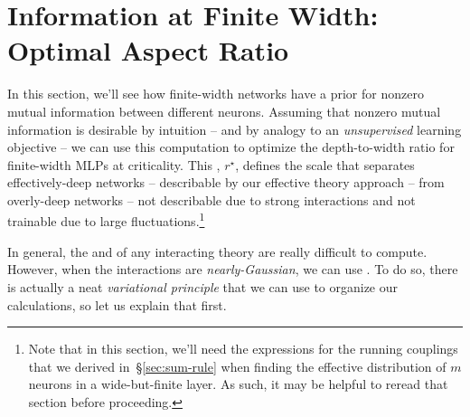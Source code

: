 \section{Information at Finite Width: Optimal Aspect Ratio}\label{sec:information-beyond-infinity}
In this section, we'll see how finite-width networks have a prior for nonzero mutual information between different neurons.
Assuming that nonzero mutual information is desirable by intuition -- and by analogy to an \emph{unsupervised} learning objective -- we can use this computation to optimize the depth-to-width ratio for finite-width MLPs at criticality. This , $r^\star$, defines the scale that separates effectively-deep networks -- describable by our  effective theory approach -- from overly-deep networks -- not describable due to strong interactions and not trainable due to large fluctuations.\footnote{Note that in this section, we'll need the expressions for the running couplings that we derived in~\S\ref{sec:sum-rule} when finding the effective distribution of $m$ neurons in a wide-but-finite layer. As such, it may be helpful to reread that section before proceeding.}

In general, the  and  of any interacting theory are really difficult to compute. However, when the interactions are \emph{nearly-Gaussian}, we can use . To do so, there is actually a neat \emph{variational principle} that we can use to organize our calculations, so let us explain that first.

